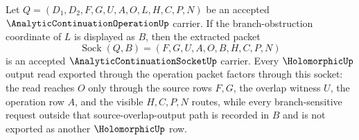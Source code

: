 \begin{theorem}
\label{thm:analytic-continuation-operation-socket-extraction}
Let $Q=(D_1,D_2,F,G,U,A,O,L,H,C,P,N)$ be an accepted $\AnalyticContinuationOperationUp$ carrier. If the branch-obstruction coordinate of $L$ is displayed as $B$, then the extracted packet
$$
\operatorname{Sock}(Q,B)=(F,G,U,A,O,B,H,C,P,N)
$$
is an accepted $\AnalyticContinuationSocketUp$ carrier. Every $\HolomorphicUp$ output read exported through the operation packet factors through this socket: the read reaches $O$ only through the source rows $F,G$, the overlap witness $U$, the operation row $A$, and the visible $H,C,P,N$ routes, while every branch-sensitive request outside that source-overlap-output path is recorded in $B$ and is not exported as another $\HolomorphicUp$ row.
\end{theorem}
